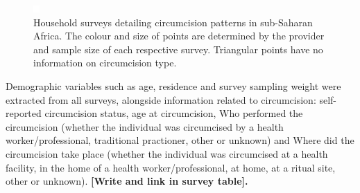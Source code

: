 \documentclass{article}
\begin{document}
\begin{appendix}
\begin{figure}[H]
    \centering
    \includegraphics[width=.9\linewidth]{paper/plots/01_survey_table.png}
    \caption{Household surveys detailing circumcision patterns in sub-Saharan Africa. The colour and size of points are determined by the provider and sample size of each respective survey. Triangular points have no information on circumcision type.}
    \label{fig:enter-label}
\end{figure}

Demographic variables such as age, residence and survey sampling weight were extracted from all surveys, alongside information related to circumcision: self-reported circumcision status, age at circumcision, Who performed the circumcision (whether the individual was circumcised by a health worker/professional, traditional practioner, other or unknown) and Where did the circumcision take place (whether the individual was circumcised at a health facility, in the home of a health worker/professional, at home, at a ritual site, other or unknown). \textbf{[Write and link in survey table].}


\end{appendix}
\end{document}
